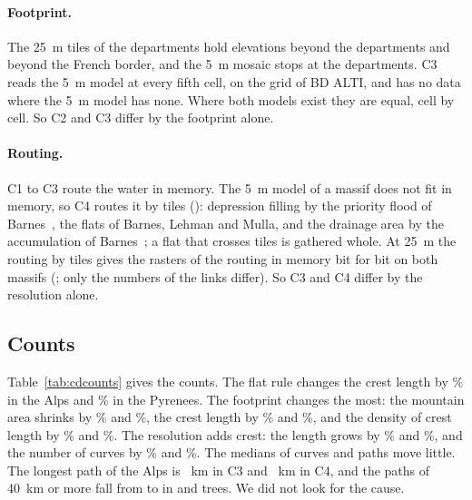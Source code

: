 \paragraph{Footprint.} The 25~m tiles of the departments hold elevations beyond the departments and beyond the French border, and the 5~m mosaic stops at the departments. C3 reads the 5~m model at every fifth cell, on the grid of BD ALTI, and has no data where the 5~m model has none. Where both models exist they are equal, cell by cell. So C2 and C3 differ by the footprint alone.

\paragraph{Routing.} C1 to C3 route the water in memory. The 5~m model of a massif does not fit in memory, so C4 routes it by tiles (): depression filling by the priority flood of Barnes~\cite{barnesfill}, the flats of Barnes, Lehman and Mulla, and the drainage area by the accumulation of Barnes~\cite{barnesacc}; a flat that crosses tiles is gathered whole. At 25~m the routing by tiles gives the rasters of the routing in memory bit for bit on both massifs (; only the numbers of the links differ). So C3 and C4 differ by the resolution alone.

\subsection{Counts}

Table~\ref{tab:cdcounts} gives the counts. The flat rule changes the crest length by \CdAlpsLenPctRule\% in the Alps and \CdPyrLenPctRule\% in the Pyrenees. The footprint changes the most: the mountain area shrinks by \CdAlpsAreaPctFoot\% and \CdPyrAreaPctFoot\%, the crest length by \CdAlpsLenPctFoot\% and \CdPyrLenPctFoot\%, and the density of crest length by \CdAlpsDensPctFoot\% and \CdPyrDensPctFoot\%. The resolution adds crest: the length grows by \CdAlpsLenPctRes\% and \CdPyrLenPctRes\%, and the number of curves by \CdAlpsCurvesPctRes\% and \CdPyrCurvesPctRes\%. The medians of curves and paths move little. The longest path of the Alps is \CdAlpsLongPathThree~km in C3 and \CdAlpsLongPathFour~km in C4, and the paths of 40~km or more fall from \CdAlpsPathsFortyThree{} to \CdAlpsPathsFortyFour{} in \CdAlpsTreesFortyThree{} and \CdAlpsTreesFortyFour{} trees. We did not look for the cause.

